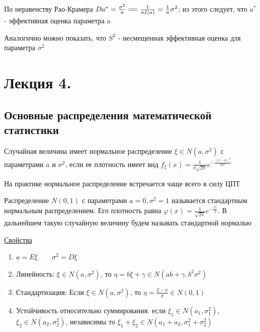 \documentclass[12pt]{article}
\begin{document}
По неравенству Рао-Крамера $Da^* = \frac{\sigma^2}{n} =\joinrel= \frac{1}{nI(a)} = \frac{1}{n} \sigma^2$; из 
этого следует, что $a^*$ - эффективная оценка параметра $a$

\Nota Аналогично можно показать, что $S^2$ - несмещенная эффективная оценка для параметра $\sigma^2$









\section{Лекция 4.}

\subsection{Основные распределения математической статистики}

\Def Случайная величина имеет нормальное распределение $\xi \in N(a, \sigma^2)$ с параметрами $a$ и $\sigma^2$, если
ее плотность имеет вид $f_\xi(x) = \frac{1}{\sigma\sqrt{2\pi}} e^{-\frac{(x - a)^2}{2\sigma^2}}$

На практике нормальное распределение встречается чаще всего в силу ЦПТ

\Def Распределение $N(0, 1)$ с параметрами $a = 0, \sigma^2 = 1$ называется стандартным нормальным распределением. 
Его плотность равна $\varphi(x) = \frac{1}{\sqrt{2\pi}} e^{-\frac{x^2}{2}}$. 
В дальнейшем такую случайную величину будем называть стандартной нормалью

\underline{Свойства}

\begin{enumerate}
    \item $a = E\xi \qquad \sigma^2 = D\xi$

    \item Линейность: $\xi \in N(a, \sigma^2)$, то $\eta = b \xi + \gamma \in N(ab + \gamma, b^2 \sigma^2)$

    \item Стандартизация: Если $\xi \in N(a, \sigma^2)$, то $\eta = \frac{\xi - a}{\sigma} \in N(0, 1)$

    \item Устойчивость относительно суммирования: если $\xi_1 \in N(a_1, \sigma^2_1)$, $\xi_2 \in N(a_2, \sigma^2_2)$, независимы
    то $\xi_1 + \xi_2 \in N(a_1 + a_2, \sigma^2_1 + \sigma^2_2)$
\end{enumerate}
\end{document}
